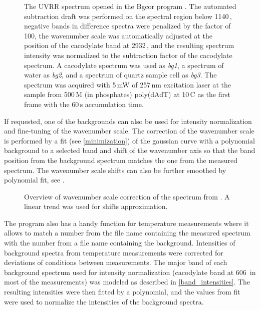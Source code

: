 \begin{figure}
	\centering
	\caption[%
		Bgcor -- program for background correction.
	]{%
		The UVRR spectrum opened in the Bgcor program
		\parencite{Bgcor2017}.
		The automated subtraction draft was performed on the spectral region below
		1140\,\icm{}, negative bands in difference spectra were penalized by the
		factor of 100, the wavenumber scale was automatically adjusted at the
		position of the cacodylate band at 2932\,\icm{}, and the resulting spectrum
		intensity was normalized to the subtraction factor of the cacodylate
		spectrum.
		A cacodylate spectrum was used as \emph{bg1}, a spectrum of water as
		\emph{bg2}, and a spectrum of quartz sample cell as \emph{bg3}.
		The spectrum was acquired with 5\,mW of 257\,nm excitation laser at the
		sample from 500\,M (in phosphates) poly(dAdT) at 10\,\textdegree{}C as
		the first frame with the 60\,s accumulation time.
	}
	\label{\figlabel{background:bgcor_main}}
\end{figure}

If requested, one of the backgrounds can also be used for intensity
normalization and fine-tuning of the wavenumber scale.
The correction of the wavenumber scale is performed by a fit (see
\cref{minimization})
of the gaussian curve with a polynomial background to a selected band and shift
of the wavenumber axis so that the band position from the background spectrum
matches the one from the measured spectrum.
The wavenumber scale shifts can also be further smoothed by polynomial fit, see
.

\begin{figure}
	\centering
	\caption[%
		Bgcor -- wavenumber scale correction.
	]{%
		Overview of wavenumber scale correction of the spectrum from
		.
		A linear trend was used for shifts approximation.
	}
	\label{\figlabel{background:bgcor_xshift}}
\end{figure}

The program also has a handy function for temperature measurements where it
allows to match a number from the file name containing the measured spectrum
with the number from a file name containing the background.
Intensities of background spectra from temperature measurements were corrected
for deviations of conditions between measurements.
The major band of each background spectrum used for intensity normalization
(cacodylate band at 606\,\icm{} in most of the measurements) was modeled as
described in
\cref{band_intensities}.
The resulting intensities were then fitted by a polynomial, and the values from
fit were used to normalize the intensities of the background spectra.

